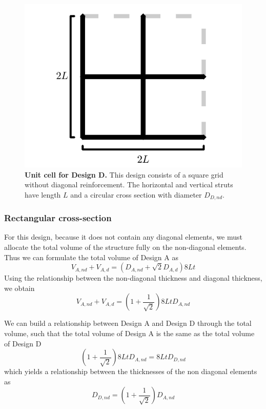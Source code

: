 \documentclass[10pt,twoside]{fernandes_supp}
\begin{document}
\begin{figure}[H]
    \centering
    \includegraphics[width=0.45\linewidth]{SFig5.png}
    \caption{{\bf Unit cell for Design D.} This design consists of a square grid without diagonal reinforcement.  The horizontal and vertical struts have length $L$ and a circular cross section with diameter $D_{D,nd}$.}
    \label{DesignD}
\end{figure}

\subsubsection{Rectangular cross-section}
For this design, because it does not contain any diagonal elements, we must allocate the total volume of the structure fully on the non-diagonal elements. Thus we can formulate the total volume of Design A as
\begin{equation}
	V_{A,nd}+V_{A,d}=(D_{A,nd}+\sqrt{2}D_{A,d})8Lt
\end{equation}
Using the relationship between the non-diagonal thickness and diagonal thickness, we obtain
\begin{equation}
V_{A,nd}+V_{A,d}=\left(1+\frac{1}{\sqrt{2}}\right)8LtD_{A,nd}
\end{equation}

We can build a relationship between Design A and Design D through the total volume, such that the total volume of Design A is the same as the total volume of Design D
\begin{equation}
\left(1+\frac{1}{\sqrt{2}}\right)8LtD_{A,nd}=8LtD_{D,nd}
\end{equation}
which yields a relationship between the thicknesses of the non diagonal elements as
\begin{equation}
	D_{D,nd}=\left(1+\frac{1}{\sqrt{2}}\right)D_{A,nd}
\end{equation}
\end{document}
